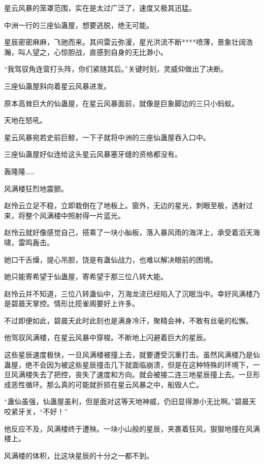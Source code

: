 
\begin{this_body}

星云风暴的笼罩范围，实在是太过广泛了，速度又极其迅猛。

中洲一行的三座仙蛊屋，想要逃脱，绝无可能。

星辰密密麻麻，飞驰而来。其间雷云弥漫，星光洪流不断****喷薄，景象壮阔浩瀚，叫人望之，心惊胆战，直感到自身的无比渺小。

“我驾驭角连营打头阵，你们紧随其后。”关键时刻，灵威仰做出了决断。

三座仙蛊屋斜向着星云风暴进发。

原本高耸巨大的仙蛊屋，在星云风暴面前，就像是巨象脚边的三只小蚂蚁。

天地在怒吼。

星云风暴宛若史前巨鲸，一下子就将中洲的三座仙蛊屋吞入口中。

三座仙蛊屋好似连给这头星云风暴塞牙缝的资格都没有。

轰隆隆……

风满楼狂烈地震颤。

赵怜云立足不稳，立即栽倒在了地板上。窗外，无边的星光，刺眼至极，透射过来，将整个风满楼中照射得一片蓝光。

赵怜云就好像感觉自己，搭乘了一块小舢板，落入暴风雨的海洋上，承受着滔天海啸，雷鸣轰击。

她口干舌燥，提心吊胆，饶是有蛊仙战力，也难以解决眼前的困境。

她只能寄希望于仙蛊屋，寄希望于那三位八转大能。

赵怜云并不知道，三位八转蛊仙中，万海龙流已经陷入了沉眠当中。幸好风满楼乃是碧晨天掌控。情形比揽雀阁要好上许多。

不过即便如此，碧晨天此时此刻也是满身冷汗，聚精会神，不敢有丝毫的松懈。

他驾驭风满楼，在星云风暴中穿梭。不断地上闪避着巨大的星辰。

这些星辰速度极快，一旦风满楼被撞上去，就要遭受沉重打击。虽然风满楼乃是仙蛊屋，绝不会因为被这些星辰撞击几下就面临崩溃，但是在这种特殊的环境下，一旦风满楼失去了把控，丧失了速度和方向。就会被接二连三地星辰撞上去。一旦形成恶性循环。那么真的可能就折损在星云风暴之中，船毁人亡。

“蛊仙虽强，仙蛊屋虽利，但是面对这等天地神威，仍旧显得渺小无比啊。”碧晨天咬紧牙关，“不好！”

他反应不及，风满楼终于遭殃。一块小山般的星辰，夹裹着狂风，狠狠地撞在风满楼上。

风满楼的体积，比这块星辰的十分之一都不到。


\end{this_body}
